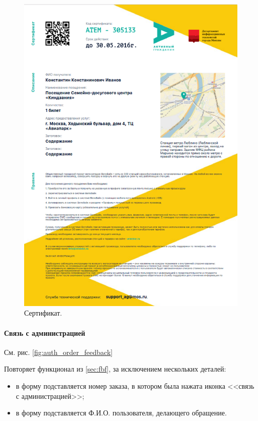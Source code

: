                 \begin{figure}
                    \center
                    \includegraphics[width=120mm]{04_auth_funcs/figures/13.eps}
                    \caption{Сертификат.}
                    \label{fig:auth_order_cert}
                \end{figure}
 
                \paragraph{Связь с администрацией}

                    \par{
                    См. рис. \ref{fig:auth_order_feedback}

                    Повторяет функционал  из \ref{sec:fbf}, за
                    исключением нескольких деталей:
                    }

                \begin{itemize}
                    \item в форму подставляется номер заказа, в котором была
                    нажата иконка <<связь с администрацией>>;
                    \item в форму подставляется Ф.И.О. пользователя, делающего
                    обращение.
                \end{itemize}

